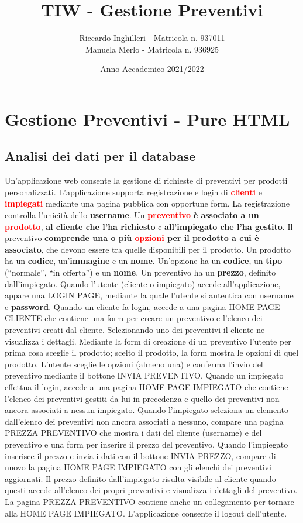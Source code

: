 \documentclass[a4paper, 12pt]{article}
\title{TIW - Gestione Preventivi}
\author{Riccardo Inghilleri - Matricola n. 937011\\Manuela Merlo - Matricola n. 936925}
\date{Anno Accademico 2021/2022}
\begin{document}

\tableofcontents
\newpage
\section{Gestione Preventivi - Pure HTML}
\subsection{Analisi dei dati per il database} \label{sub: Analisi dei dati per il database}
Un’applicazione web consente la gestione di richieste di preventivi per prodotti personalizzati. L’applicazione supporta registrazione e login di \textbf{\textcolor{red}{clienti}} e \textbf{\textcolor{red}{impiegati}} mediante una pagina pubblica con opportune form. La registrazione controlla l’unicità dello \textbf{\textcolor{myGreen}{username}}. Un \textbf{\textcolor{red}{preventivo}} \textbf{\textcolor{myBlue}{è associato a un}} \textbf{\textcolor{red}{prodotto}}, \textbf{\textcolor{myBlue}{al cliente che l’ha richiesto}} e \textbf{\textcolor{myBlue}{all’impiegato che l’ha gestito}}. Il preventivo \textbf{\textcolor{myBlue}{comprende una o più} \textcolor{red}{opzioni} \textcolor{myBlue}{per il prodotto a cui è associato}}, che devono essere tra quelle disponibili per il prodotto. Un prodotto ha un \textbf{\textcolor{myGreen}{codice}}, un’\textbf{\textcolor{myGreen}{immagine}} e un \textbf{\textcolor{myGreen}{nome}}. Un’opzione ha un \textbf{\textcolor{myGreen}{codice}}, un \textbf{\textcolor{myGreen}{tipo}} (“normale”, “in offerta”) e un \textbf{\textcolor{myGreen}{nome}}. Un preventivo ha un \textbf{\textcolor{myGreen}{prezzo}}, definito dall’impiegato. Quando l’utente (cliente o impiegato) accede all’applicazione, appare una LOGIN PAGE, mediante la quale l’utente si autentica con username e \textbf{\textcolor{myGreen}{password}}. Quando un cliente fa login, accede a una pagina HOME PAGE CLIENTE che contiene una form per creare un preventivo e l’elenco dei preventivi creati dal cliente. Selezionando uno dei preventivi il cliente ne visualizza i dettagli. Mediante la form di creazione di un preventivo l’utente per prima cosa sceglie il prodotto; scelto il prodotto, la form mostra le opzioni di quel prodotto. L’utente sceglie le opzioni (almeno una) e conferma l’invio del preventivo mediante il bottone INVIA PREVENTIVO. Quando un impiegato effettua il login, accede a una pagina HOME PAGE IMPIEGATO che contiene l’elenco dei preventivi gestiti da lui in precedenza e quello dei preventivi non ancora associati a nessun impiegato. Quando l’impiegato seleziona un elemento dall’elenco dei preventivi non ancora associati a nessuno, compare una pagina PREZZA PREVENTIVO che mostra i dati del cliente (username) e del preventivo e una form per inserire il prezzo del preventivo. Quando l’impiegato inserisce il prezzo e invia i dati con il bottone INVIA PREZZO, compare di nuovo la pagina HOME PAGE IMPIEGATO con gli elenchi dei preventivi aggiornati. Il prezzo definito dall’impiegato risulta visibile al cliente quando questi accede all’elenco dei propri preventivi e visualizza i dettagli del preventivo. La pagina PREZZA PREVENTIVO contiene anche un collegamento per tornare alla HOME PAGE IMPIEGATO. L’applicazione consente il logout dell’utente.\\
\end{document}
